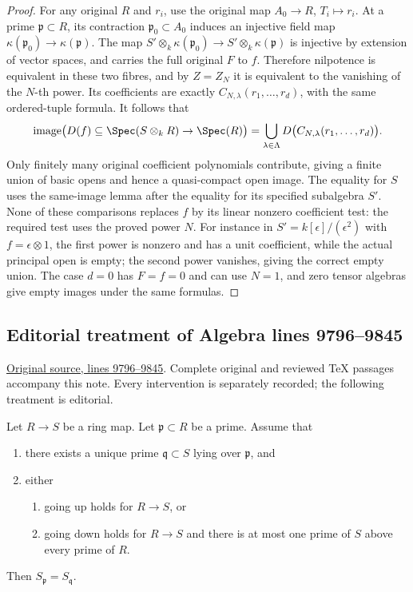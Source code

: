 \begin{proof}
For any original $R$ and $r_i$, use the original
map $A_0\to R$, $T_i\mapsto r_i$.
At a prime $\mathfrak p\subset R$, its contraction
$\mathfrak p_0\subset A_0$ induces an injective
field map $\kappa(\mathfrak p_0)\to\kappa(\mathfrak p)$.
The map
$S'\otimes_k\kappa(\mathfrak p_0)\to
S'\otimes_k\kappa(\mathfrak p)$ is injective by
extension of vector spaces, and carries the full
original $F$ to $f$. Therefore nilpotence is
equivalent in these two fibres, and by $Z=Z_N$
it is equivalent to the vanishing of the $N$-th
power. Its coefficients are exactly
$C_{N,\lambda}(r_1,\ldots,r_d)$, with the same
ordered-tuple formula. It follows that
$$
\operatorname{image}\bigl(D(f)\subseteq
\Spec(S\otimes_kR)\to\Spec(R)\bigr)
=\bigcup_{\lambda\in\Lambda}
D\bigl(C_{N,\lambda}(r_1,\ldots,r_d)\bigr).
$$
Only finitely many original coefficient polynomials
contribute, giving a finite union of basic opens
and hence a quasi-compact open image. The equality
for $S$ uses the same-image lemma after the equality
for its specified subalgebra $S'$. None of these
comparisons replaces $f$ by its linear nonzero
coefficient test: the required test uses the
proved power $N$. For instance in
$S'=k[\epsilon]/(\epsilon^2)$ with $f=\epsilon\otimes1$,
the first power is nonzero and has a unit coefficient,
while the actual principal open is empty; the
second power vanishes, giving the correct empty
union. The case $d=0$ has $F=f=0$ and can use
$N=1$, and zero tensor algebras give empty images
under the same formulas.
\end{proof}


\subsection{Editorial treatment of Algebra lines 9796--9845}

\hypertarget{algebra-context-114}{}

\noindent\href{https://github.com/stacks/stacks-project/blob/a04446e57ec1fbc252a871afcec7752fb2807b14/algebra.tex\#L9796}{Original source, lines 9796--9845}. Complete original and reviewed TeX passages accompany this note. Every intervention is separately recorded; the following treatment is editorial.


\begin{lemma}
\label{editorial-source-lemma-unique-prime-over-localize-below}
Let $R \to S$ be a ring map.
Let $\mathfrak p \subset R$ be a prime.
Assume that
\begin{enumerate}
\item there exists a unique prime $\mathfrak q \subset S$ lying over
$\mathfrak p$, and
\item either
\begin{enumerate}
\item going up holds for $R \to S$, or
\item going down holds for $R \to S$ and there is at most one prime
of $S$ above every prime of $R$.
\end{enumerate}
\end{enumerate}
Then $S_{\mathfrak p} = S_{\mathfrak q}$.
\end{lemma}

